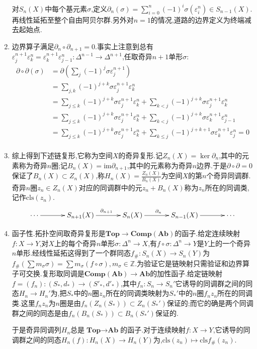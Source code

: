 \begin{enumerate}
	对$S_n(X)$中每个基元素$\sigma$,定义$\partial_n(\sigma)=\sum_{i=0}^n(-1)^i\sigma(\varepsilon_i^n)\in S_{n-1}(X)$.再线性延拓至整个自由阿贝尔群.另外对$n=1$的情况,道路的边界定义为终端减去起始点.
	\item 边界算子满足$\partial_n\circ\partial_{n+1}=0$.事实上注意到总有$\varepsilon_j^{n+1}\varepsilon_k^n=\varepsilon_k^{n+1}\varepsilon_{j-1}^n:\Delta^{n-1}\to\Delta^{n+1}$,任取奇异$n+1$单形$\sigma$:
	\begin{align*}
	\partial\circ\partial(\sigma)&=\partial\left(\sum_j(-1)^j\sigma\varepsilon_j^{n+1}\right)\\
	&=\sum_{j,k}(-1)^{j+k}\sigma\varepsilon_j^{n+1}\varepsilon_k^n\\
	&=\sum_{j\le k}(-1)^{j+k}\sigma\varepsilon_j^{n+1}\varepsilon_k^n+\sum_{k<j}(-1)^{j+k}\sigma\varepsilon_j^{n+1}\varepsilon_k^n\\
	&=\sum_{j\le k}(-1)^{j+k}\sigma\varepsilon_j^{n+1}\varepsilon_k^n+\sum_{k<j}(-1)^{j+k}\sigma\varepsilon_k^{n+1}\varepsilon_{j-1}^n\\
	&=\sum_{j\le k}(-1)^{j+k}\sigma\varepsilon_j^{n+1}\varepsilon_k^n+\sum_{k\le j}(-1)^{j+k+1}\sigma\varepsilon_k^{n+1}\varepsilon_j^n=0\\
	\end{align*}
	\item 综上得到下述链复形,它称为空间$X$的奇异复形.记$Z_n(X)=\ker\partial_n$,其中的元素称为奇异$n$圈;记$B_n(X)=\mathrm{im}\partial_{n+1}$,其中的元素称为奇异$n$边界.于是$\partial\circ\partial=0$保证了$B_n(X)\subset Z_n(X)$,称$H_n(X)=\frac{Z_n(X)}{B_n(X)}$为空间$X$的第$n$个奇异同调群.奇异$n$圈$z_n\in Z_n(X)$对应的同调群中的元$z_n+B_n(X)$称为$z_n$所在的同调类,记作$\mathrm{cls}(z_n)$.
	$$\xymatrix@C=0.5cm{
		\cdots \ar[rr]^{} && S_{n+1}(X) \ar[rr]^{\partial_{n+1}} && S_n(X) \ar[rr]^{\partial_n} && S_{n-1}(X) \ar[rr]^{} &&\cdots }$$
	\item 
	函子性.拓扑空间取奇异复形是$\textbf{Top}\to\textbf{Comp}(\textbf{Ab})$的函子.给定连续映射$f:X\to Y$,对$X$上的每个奇异$n$单形$\sigma:\Delta^n\to X$,有$f\circ\sigma:\Delta^n\to Y$是$Y$上的一个奇异$n$单形.经线性延拓这得到了一个群同态$f_{\#}:S_n(X)\to S_n(Y)$为$f_{\#}(\sum m_{\sigma}\sigma)=\sum m_{\sigma}(f\circ\sigma),m_{\sigma}\in\mathbb{Z}$.为验证它是链映射只需验证和边界算子可交换.复形取同调是$\textbf{Comp}(\textbf{Ab})\to\textbf{Ab}$的加性函子.给定链映射$f=(f_n):(S_*,d_*)\to (S'_*,d'_*)$,其中$f_n:S_n\to S_n'$它诱导的同调群之间的同态$H_n\to H_n'$为,把$S_*$中的$n$圈$z_n$所在的同调类映射为$S_*'$中的$n$圈$f_nz_n$所在的同调类.这里$f_nz_n$为$n$圈是由$f_n(Z_n(S_*))\subset Z_n(S_*')$保证的;而它的确是两个同调群之间的同态是由$f_n(B_n(S_*))\subset B_n(S_*')$保证的.
	
	于是奇异同调列$H_n$总是$\textbf{Top}\to\textbf{Ab}$的函子.对于连续映射$f:X\to Y$,它诱导的同调群之间的同态$H_n(f):H_n(X)\to H_n(Y)$为,$\mathrm{cls}(z_n)\mapsto\mathrm{cls}f_{\#}(z_n)$.
\end{enumerate}

